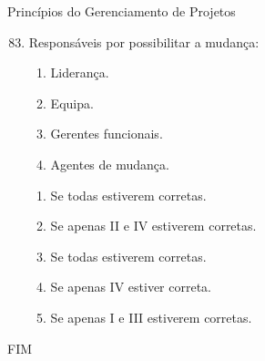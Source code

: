 \documentclass{beamer}
\begin{document}
\begin{frame}{Princípios do Gerenciamento de Projetos}
	\begin{enumerate}
		\setcounter{enumi}{82}
		\justifying
		\item Responsáveis por possibilitar a mudança:
		\begin{enumerate}[I]
			\item Liderança.
			\item Equipa.
			\item Gerentes funcionais.
			\item Agentes de mudança.
		\end{enumerate}
		\begin{enumerate}[a]
			\item Se todas estiverem corretas.
			\item Se apenas II e IV estiverem corretas.
			\item \alert<2>{Se todas estiverem corretas.}
			\item Se apenas IV estiver correta.
			\item Se apenas I e III estiverem corretas.
		\end{enumerate}
	\end{enumerate}
\end{frame}

\begin{frame}
	\centering
	\Large
	FIM
\end{frame}
\end{document}
